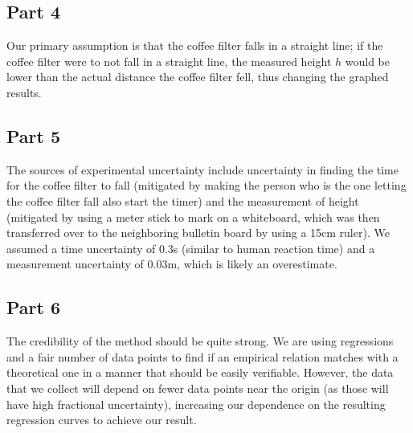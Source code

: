 \documentclass[8pt]{extarticle}
\begin{document}
{\subsection*{Part 4}%
Our primary assumption is that the coffee filter falls in a straight line; if the coffee filter were to not fall in a straight line, the measured height $h$ would be lower than the actual distance the coffee filter fell, thus changing the graphed results.
\subsection*{Part 5}
The sources of experimental uncertainty include uncertainty in finding the time for the coffee filter to fall (mitigated by making the person who is the one letting the coffee filter fall also start the timer) and the measurement of height (mitigated by using a meter stick to mark on a whiteboard, which was then transferred over to the neighboring bulletin board by using a 15cm ruler). We assumed a time uncertainty of $0.3$s (similar to human reaction time) and a measurement uncertainty of $0.03$m, which is likely an overestimate.
\subsection*{Part 6}
The credibility of the method should be quite strong. We are using regressions and a fair number of data points to find if an empirical relation matches with a theoretical one in a manner that should be easily verifiable. However, the data that we collect will depend on fewer data points near the origin (as those will have high fractional uncertainty), increasing our dependence on the resulting regression curves to achieve our result.
}
\end{document}
